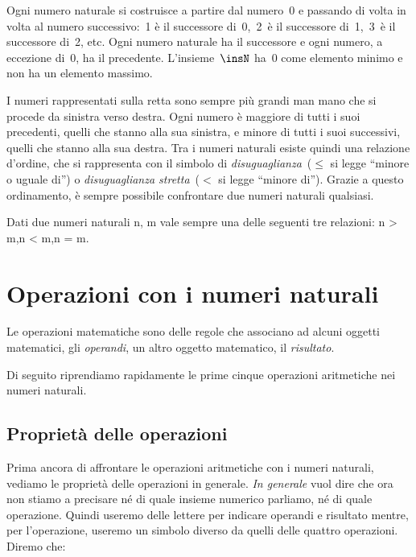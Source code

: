 \begin{inaccessibleblock}
\begin{center}
 
\end{center}
\end{inaccessibleblock}

Ogni numero naturale si costruisce a partire dal numero~0 e passando di volta 
in volta al numero successivo:~1 è il successore di~0,~2~è il successore 
di~1,~3~è il successore di~2, etc. 
Ogni numero naturale ha il successore e ogni numero, a eccezione di~0, ha il
precedente. 
L'insieme~$\insN$ ha~0 come elemento minimo e non ha un elemento massimo.

I numeri rappresentati sulla retta sono sempre più grandi man mano che si 
procede da sinistra verso destra. 
Ogni numero è maggiore di tutti i suoi precedenti, quelli che stanno alla sua 
sinistra, e minore di tutti i suoi successivi, quelli che stanno alla sua 
destra. 
Tra i numeri naturali esiste quindi una relazione d'ordine, che si rappresenta 
con il simbolo di 
\emph{disuguaglianza}~($\le$ si legge ``minore o uguale di'') o 
\emph{disuguaglianza stretta}~($<$ si legge ``minore di'').
Grazie a questo ordinamento, è sempre possibile confrontare due numeri 
naturali qualsiasi.

\begin{legge}[di tricotomia]
Dati due numeri naturali n, m vale sempre una delle seguenti tre relazioni: 
\quad n > m,\quad n < m,\quad n = m.
\end{legge}

\section{Operazioni con i numeri naturali}
\label{sec:01_operazioni}

Le operazioni matematiche sono delle regole che associano ad
alcuni oggetti matematici, gli \emph{operandi}, un altro oggetto matematico, 
il \emph{risultato}.

Di seguito riprendiamo rapidamente le prime cinque operazioni aritmetiche 
nei numeri naturali. 

\subsection{Proprietà delle operazioni}

Prima ancora di affrontare le operazioni aritmetiche con i numeri naturali, 
vediamo le proprietà delle operazioni in generale. \emph{In generale} vuol 
dire che ora non stiamo a precisare né di quale insieme numerico parliamo, 
né di quale operazione. Quindi useremo delle lettere per indicare  
operandi e  risultato mentre, per l'operazione, useremo un simbolo diverso 
da quelli delle quattro operazioni. Diremo che:

